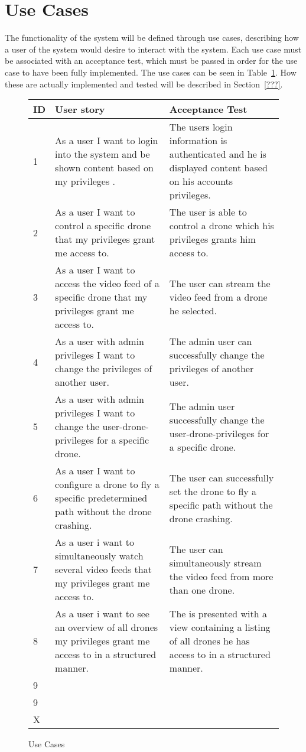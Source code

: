 \section{Use Cases}
The functionality of the system will be defined through use cases, describing how a user of the system would desire to interact with the system.
Each use case must be associated with an acceptance test, which must be passed in order for the use case to have been fully implemented.
The use cases can be seen in Table~\ref{tab:use_cases}.
How these are actually implemented and tested will be described in Section~\ref{???}.

\begin{figure}[H]
\begin{center}
\begin{tabular}{ | l | p{6cm} | p{6cm} | }
  \hline              
	\textbf{ID} & \textbf{User story} & \textbf{Acceptance Test} \\ \hline
	1 & As a user I want to login into the system and be shown content based on my privileges .& The users login information is authenticated and he is displayed content based on his accounts privileges.\\ \hline
	2 & As a user I want to control a specific drone that my privileges grant me access to. & The user is able to control a drone which his privileges grants him access to. \\ \hline
	3 & As a user I want to access the video feed of a specific drone that my privileges grant me access to. & The user can stream the video feed from a drone he selected.\\ \hline
	4 & As a user with admin privileges I want to change the privileges of another user. & The admin user can successfully change the privileges of another user. \\ \hline
	5 & As a user with admin privileges I want to change the user-drone-privileges for a specific drone. & The admin user successfully change the user-drone-privileges for a specific drone. \\ \hline
	6 & As a user I want to configure a drone to fly a specific predetermined path without the drone crashing. & The user can successfully set the drone to fly a specific path without the drone crashing. \\ \hline
	7 & As a user i want to simultaneously watch several video feeds that my privileges grant me access to. & The user can simultaneously stream the video feed from more than one drone. \\ \hline
	8 & As a user i want to see an overview of all drones my privileges grant me access to in a structured manner. &  The is presented with a view containing a listing of all drones he has access to in a structured manner.\\ \hline
	9 & &  \\ \hline
	9 & &  \\ \hline
	X & &  \\ 
  \hline  
\end{tabular}

\caption{Use Cases}
\label{tab:use_cases}
\end{center}
\end{figure}